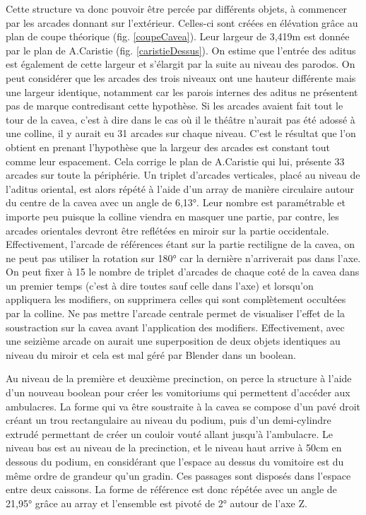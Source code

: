 Cette structure va donc pouvoir être percée par différents objets, à commencer par les arcades donnant sur l'extérieur. Celles-ci sont créées en élévation grâce au plan de coupe théorique (fig. \ref{coupeCavea}). Leur largeur de 3,419m est donnée par le plan de A.Caristie (fig. \ref{caristieDessus}). On estime que l'entrée des \gls{aditus} est également de cette largeur et s'élargit par la suite au niveau des \gls{parodos}. On peut considérer que les arcades des trois niveaux ont une hauteur différente mais une largeur identique, notamment car les parois internes des \gls{aditus} ne présentent pas de marque contredisant cette hypothèse. Si les arcades avaient fait tout le tour de la  \gls{cavea}, c'est à dire dans le cas où il le théâtre n'aurait pas été adossé à une colline, il y aurait eu 31 arcades sur chaque niveau. C'est le résultat que l'on obtient en prenant l'hypothèse que la largeur des arcades est constant tout comme leur espacement. Cela corrige le plan de A.Caristie qui lui, présente 33 arcades sur toute la périphérie. Un triplet d'arcades verticales, placé au niveau de l'\gls{aditus} oriental, est alors répété à l'aide d'un \gls{array} de manière circulaire autour du centre de la \gls{cavea} avec un angle de 6,13°. Leur nombre est paramétrable et importe peu puisque la colline viendra en masquer une partie, par contre, les arcades orientales devront être reflétées en miroir sur la partie occidentale. Effectivement, l'arcade de références étant sur la partie rectiligne de la \gls{cavea}, on ne peut pas utiliser la rotation sur 180° car la dernière n'arriverait pas dans l'axe. On peut fixer à 15 le nombre de triplet d'arcades de chaque coté de la \gls{cavea} dans un premier temps (c'est à dire toutes sauf celle dans l'axe) et lorsqu'on appliquera les \glspl{modifier}, on supprimera celles qui sont complètement occultées par la colline. Ne pas mettre l'arcade centrale permet de visualiser l'effet de la soustraction sur la \gls{cavea} avant l'application des \glspl{modifier}. Effectivement, avec une seizième arcade on aurait une superposition de deux objets identiques au niveau du miroir et cela est mal géré par Blender dans un \gls{boolean}. 

 Au niveau de la première et deuxième \gls{precinction}, on perce la structure à l'aide d'un nouveau \gls{boolean} pour créer les \glspl{vomitorium} qui permettent d'accéder aux  \glspl{ambulacre}. La forme qui va être soustraite à la \gls{cavea} se compose d'un pavé droit créant un trou rectangulaire au niveau du \gls{podium}, puis d'un demi-cylindre extrudé permettant de créer un couloir vouté allant jusqu'à l'\gls{ambulacre}. Le niveau bas est au niveau de la \gls{precinction}, et le niveau haut arrive à 50cm en dessous du  \gls{podium}, en considérant que l'espace au dessus du vomitoire est du même ordre de grandeur qu'un gradin. Ces passages sont disposés dans l'espace entre deux caissons. La forme de référence est donc répétée avec un angle de 21,95° grâce au \gls{array} et l'ensemble est pivoté de 2° autour de l'axe Z. 

